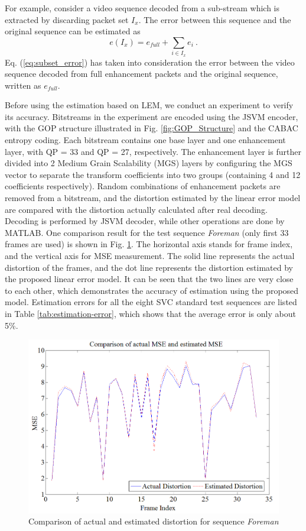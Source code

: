 \documentclass[journal]{IEEEtran}
\begin{document}
For example, consider a video sequence decoded from a sub-stream which is extracted by discarding packet set $I_x$. The error between this sequence and the original sequence can be estimated as
\begin{equation}
\label{eq:subset_error}
e(I_x) = e_{full} + \sum_{i \in {I_x}} e_i \: .
\end{equation}
Eq. (\ref{eq:subset_error}) has taken into consideration the error between the video sequence decoded from full enhancement packets and the original sequence, written as $e_{full}$.

Before using the estimation based on LEM, we conduct an experiment to verify its accuracy. Bitstreams in the experiment are encoded using the JSVM encoder, with the GOP structure illustrated in Fig. \ref{fig:GOP_Structure} and the CABAC entropy coding. Each bitstream contains one base layer and one enhancement layer, with QP = 33 and QP = 27, respectively. The enhancement layer is further divided into 2 Medium Grain Scalability (MGS) layers by configuring the MGS vector to separate the transform coefficients into two groups (containing 4 and 12 coefficients respectively). Random combinations of enhancement packets are removed from a bitstream, and the distortion estimated by the linear error model are compared with the distortion actually calculated after real decoding. Decoding is performed by JSVM decoder, while other operations are done by MATLAB. One comparison result for the test sequence {\em Foreman} (only first 33 frames are used) is shown in Fig. \ref{fig:model_verification}. The horizontal axis stands for frame index, and the vertical axis for MSE measurement. The solid line represents the actual distortion of the frames, and the dot line represents the distortion estimated by the proposed linear error model. It can be seen that the two lines are very close to each other, which demonstrates the accuracy of estimation using the proposed model. Estimation errors for all the eight SVC standard test sequences are listed in Table \ref{tab:estimation-error}, which shows that the average error is only about 5\%.

\begin{figure}[t]
\centering
\includegraphics[width = 0.9\linewidth]{ModelVerification.png}
\caption{Comparison of actual and estimated distortion for sequence {\em Foreman} \label{fig:model_verification}}
\end{figure}
\end{document}
